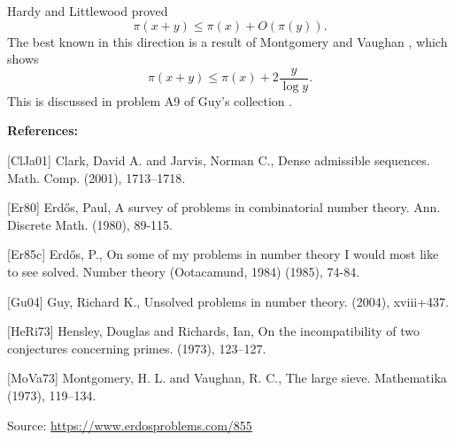 \documentclass{article}
\begin{document}
Hardy and Littlewood proved\[\pi(x+y) \leq \pi(x)+O(\pi(y)).\]The best known in this direction is a result of Montgomery and Vaughan \cite{MoVa73}, which shows\[\pi(x+y) \leq \pi(x)+2\frac{y}{\log y}.\]This is discussed in problem A9 of Guy's collection \cite{Gu04}.

\bigskip
\noindent\textbf{References:}

[ClJa01] Clark, David A. and Jarvis, Norman C., Dense admissible sequences. Math. Comp. (2001), 1713--1718.
 
 [Er80] Erd\H{o}s, Paul, A survey of problems in combinatorial number theory. Ann. Discrete Math. (1980), 89-115.
 
 [Er85c] Erd\H{o}s, P., On some of my problems in number theory I would most like to see solved. Number theory (Ootacamund, 1984) (1985), 74-84.
 
 [Gu04] Guy, Richard K., Unsolved problems in number theory. (2004), xviii+437.
 
 [HeRi73] Hensley, Douglas and Richards, Ian, On the incompatibility of two conjectures concerning primes. (1973), 123--127.
 
 [MoVa73] Montgomery, H. L. and Vaughan, R. C., The large sieve. Mathematika (1973), 119--134.

\bigskip
\noindent\small{Source: \url{https://www.erdosproblems.com/855}}
\end{document}
